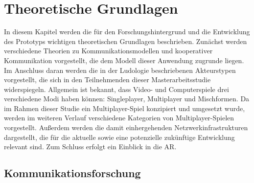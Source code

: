\chapter{Theoretische Grundlagen}\label{sec:basics}

In diesem Kapitel werden die für den Forschungshintergrund und die Entwicklung des Prototyps wichtigen theoretischen Grundlagen beschrieben.
Zunächst werden verschiedene Theorien zu Kommunikationsmodellen und kooperativer Kommunikation vorgestellt, die dem Modell dieser Anwendung zugrunde liegen.
Im Anschluss daran werden die in der Ludologie beschriebenen Akteurstypen vorgestellt, die sich in den Teilnehmenden dieser Masterarbeitsstudie widerspiegeln.
Allgemein ist bekannt, dass Video- und Computerspiele drei verschiedene Modi haben können: Singleplayer, Multiplayer und Mischformen. Da im Rahmen dieser Studie ein Multiplayer-Spiel konzipiert und umgesetzt wurde, werden im weiteren Verlauf verschiedene Kategorien von Multiplayer-Spielen vorgestellt. Außerdem werden die damit einhergehenden Netzwerkinfrastrukturen dargestellt, die für die aktuelle sowie eine potenzielle zukünftige Entwicklung relevant sind. Zum Schluss erfolgt ein Einblick in die \ac{AR}.



\section{Kommunikationsforschung}

